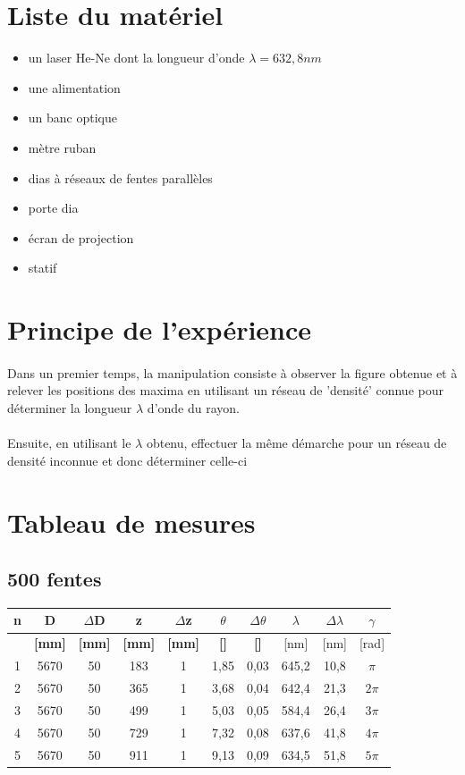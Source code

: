 \documentclass[11pt,a4paper]{report}
\begin{document}
	\section{Liste du matériel}
	\begin{itemize}
	\item un laser He-Ne dont la longueur d'onde $\lambda = 632,8nm$
	\item une alimentation
	\item un banc optique
	\item mètre ruban
	\item dias à réseaux de fentes parallèles
	\item porte dia
	\item écran de projection
	\item statif
	\end{itemize}
	\section{Principe de l'expérience}
\paragraph{}
Dans un premier temps, la manipulation consiste à observer la figure obtenue et à relever les positions des maxima en utilisant un réseau de 'densité' connue pour déterminer la longueur $\lambda$ d'onde du rayon.

\paragraph{}
Ensuite, en utilisant le $\lambda$ obtenu, effectuer la même démarche pour un réseau de densité inconnue et donc déterminer celle-ci

	\section{Tableau de mesures}
	\subsection{500 fentes}
	\begin{center}	
	\begin{tabular}{|c|c|c|c|c|c|c|c|c|c|}
		\hline
		\bf n & \bf D & \bf $\Delta$D & \bf z & \bf $\Delta$z & \bf $\theta$ & \bf $\Delta \theta$ & $\lambda$& $\Delta \lambda$&\bf $\gamma$ \\
		\hline
		 & \bf [mm] & \bf [mm] & \bf [mm] & \bf [mm] & \bf [\degre]  & \bf [\degre]  &  [nm] & [nm] & [rad]\\
		\hline
		1 & 5670 & 50 & 183 &   1&1,85&0,03&645,2&10,8 &$\pi$\\
		2 & 5670 & 50 & 365 &  1&3,68&0,04&642,4&21,3&$2\pi$\\
		3 & 5670 & 50 & 499 &  1&5,03&0,05&584,4&26,4&$3\pi$\\
		4 & 5670 & 50 & 729 &  1&7,32&0,08&637,6&41,8&$4\pi$\\
		5 & 5670 & 50 & 911 &  1&9,13&0,09&634,5&51,8&$5\pi$\\
		\hline
	\end{tabular}
	\end{center}
\end{document}
